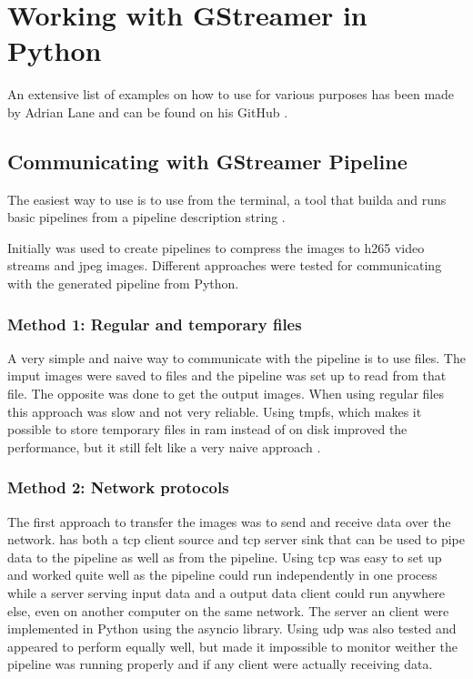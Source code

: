 
\section{Working with GStreamer in Python}
An extensive list of examples on how to use  for various purposes has been made by Adrian Lane and can be found on his GitHub \cite{laneGStreamerPipelineSamples2020}.


\subsection{Communicating with GStreamer Pipeline}
The easiest way to use \gs is to use  from the terminal, a tool that builda and runs basic \gs pipelines from a pipeline description string \cite{Gstlaunch1}.

Initially  was used to create pipelines to compress the images to \gls{h265} video streams and \gls{jpeg} images.
Different approaches were tested for communicating with the generated pipeline from Python.

\subsubsection{Method 1: Regular and temporary files}
A very simple and naive way to communicate with the pipeline is to use files.
The imput images were saved to files and the pipeline was set up to read from that file.
The opposite was done to get the output images.
When using regular files this approach was slow and not very reliable.
Using \gls{tmpfs}, which makes it possible to store temporary files in \gls{ram} instead of on disk improved the performance, but it still felt like a very naive approach \cite{dickinsTmpfsLinuxKernel2010}.

\subsubsection{Method 2: Network protocols}
The first approach to transfer the images was to send and receive data over the network.
\gs has both a \gls{tcp} client source and \gls{tcp} server sink that can be used to pipe data to the pipeline as well as from the pipeline.
Using \gls{tcp} was easy to set up and worked quite well as the pipeline could run independently in one process while a server serving input data and a output data client could run anywhere else, even on another computer on the same network.
The server an client were implemented in Python using the \gls{asyncio} library.
Using \gls{udp} was also tested and appeared to perform equally well, but made it impossible to monitor weither the pipeline was running properly and if any client were actually receiving data.


